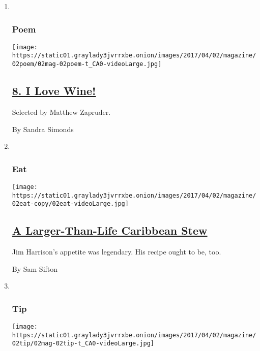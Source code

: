 \begin{enumerate}
\def\labelenumi{\arabic{enumi}.}
\item ~
  \hypertarget{poem}{%
  \subsubsection{Poem}\label{poem}}

  \texttt{[image: https://static01.graylady3jvrrxbe.onion/images/2017/04/02/magazine/02poem/02mag-02poem-t\_CA0-videoLarge.jpg]}

  \hypertarget{8-i-love-wine}{%
  \subsection{\texorpdfstring{\href{/2017/03/31/magazine/8-i-love-wine.html}{8.
  I Love Wine!}}{8. I Love Wine!}}\label{8-i-love-wine}}

  Selected by Matthew Zapruder.

  By Sandra Simonds
\item ~
  \hypertarget{eat}{%
  \subsubsection{Eat}\label{eat}}

  \texttt{[image: https://static01.graylady3jvrrxbe.onion/images/2017/04/02/magazine/02eat-copy/02eat-videoLarge.jpg]}

  \hypertarget{a-larger-than-life-caribbean-stew}{%
  \subsection{\texorpdfstring{\href{/2017/03/30/magazine/a-larger-than-life-caribbean-stew.html}{A
  Larger-Than-Life Caribbean
  Stew}}{A Larger-Than-Life Caribbean Stew}}\label{a-larger-than-life-caribbean-stew}}

  Jim Harrison's appetite was legendary. His recipe ought to be, too.

  By Sam Sifton
\item ~
  \hypertarget{tip}{%
  \subsubsection{Tip}\label{tip}}

  \texttt{[image: https://static01.graylady3jvrrxbe.onion/images/2017/04/02/magazine/02tip/02mag-02tip-t\_CA0-videoLarge.jpg]}

  \hypertarget{how-to-run-for-local-office}{%
}
\end{enumerate}
